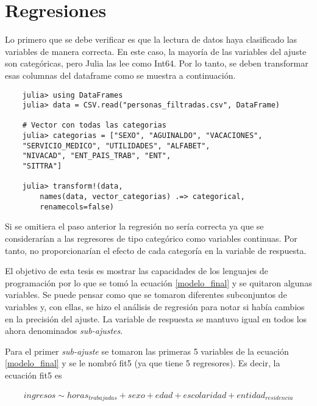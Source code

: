 \section{Regresiones} \label{reg_categorias}

Lo primero que se debe verificar es que la lectura de datos haya clasificado las variables de manera correcta.  En este caso, la mayoría de las variables del ajuste son categóricas, pero \textsf{Julia} las lee como \textsf{Int64}. Por lo tanto, se deben transformar esas columnas del dataframe como se muestra a continuación. 

\begin{verbatim}
	julia> using DataFrames
	julia> data = CSV.read("personas_filtradas.csv", DataFrame)

	# Vector con todas las categorias
	julia> categorias = ["SEXO", "AGUINALDO", "VACACIONES", 
	"SERVICIO_MEDICO", "UTILIDADES", "ALFABET",
	"NIVACAD", "ENT_PAIS_TRAB", "ENT", 
	"SITTRA"]

	julia> transform!(data, 
		names(data, vector_categorias) .=> categorical, 
		renamecols=false)
\end{verbatim}

Si se omitiera el paso anterior la regresión no sería correcta ya que se considerarían a las regresores de tipo categórico como variables continuas. Por tanto, no proporcionarían el efecto de cada categoría en la variable de respuesta.

El objetivo de esta tesis es mostrar las capacidades de los lenguajes de programación por lo que se tomó la ecuación \ref{modelo_final} y se quitaron algunas variables. Se puede pensar como que se tomaron diferentes subconjuntos de variables y, con ellas, se hizo el análisis de regresión para notar si había cambios en la precisión del ajuste. La variable de respuesta se mantuvo igual en todos los ahora denominados \textit{sub-ajustes}.

Para el primer \textit{sub-ajuste} se tomaron las primeras 5 variables de la ecuación \ref{modelo_final} y se le nombró \textsf{fit5} (ya que tiene 5 regresores). Es decir, la ecuación \textsf{fit5} es 

\begin{equation*}
    \begin{aligned}
    ingresos \sim horas_{trabajadas} + sexo + edad + escolaridad + entidad_{residencia}
    \end{aligned}
\end{equation*}


